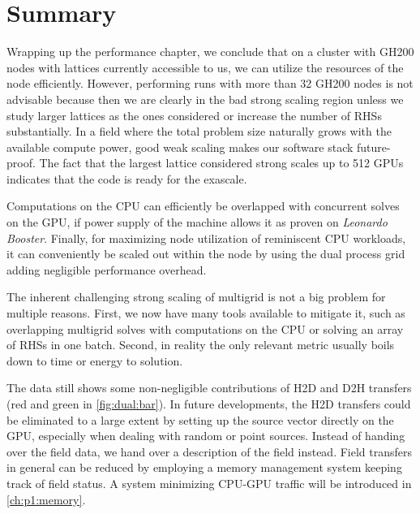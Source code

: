 \section{Summary}
\label{sec:perf:summary}

Wrapping up the performance chapter, we conclude that on a cluster with GH200 nodes with lattices currently accessible to us, we can utilize the resources of the node efficiently.
However, performing runs with more than \num{32} GH200 nodes is not advisable because then we are clearly in the bad strong scaling region unless we study larger lattices as the ones considered or increase the number of RHSs substantially.
In a field where the total problem size naturally grows with the available compute power, good weak scaling makes our software stack future-proof.
The fact that the largest lattice considered strong scales up to \num{512} GPUs indicates that the code is ready for the exascale.


Computations on the CPU can efficiently be overlapped with concurrent solves on the GPU, if power supply of the machine allows it as proven on \emph{Leonardo Booster}.
Finally, for maximizing node utilization of reminiscent CPU workloads, it can conveniently be scaled out within the node by using the dual process grid adding negligible performance overhead.

The inherent challenging strong scaling of multigrid is not a big problem for multiple reasons.
First, we now have many tools available to mitigate it, such as overlapping multigrid solves with computations on the CPU or solving an array of RHSs in one batch.
Second, in reality the only relevant metric usually boils down to time or energy to solution.


The data still shows some non-negligible contributions of H2D and D2H transfers (red and green in \cref{fig:dual:bar}).
In future developments, the H2D transfers could be eliminated to a large extent by setting up the source vector directly on the GPU, especially when dealing with random or point sources.
Instead of handing over the field data, we hand over a description of the field instead.
Field transfers in general can be reduced by employing a memory management system keeping track of field status.
A system minimizing CPU-GPU traffic will be introduced in \cref{ch:p1:memory}.

